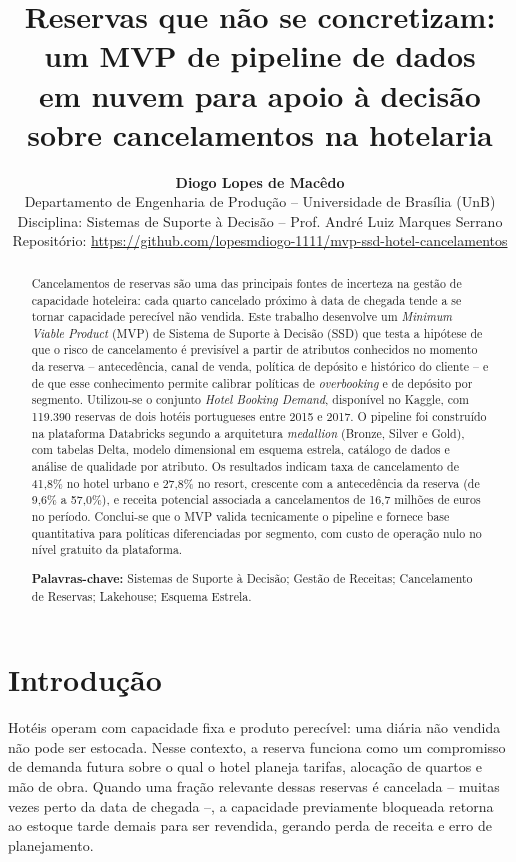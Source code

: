 \documentclass[11pt,a4paper]{article}
\title{\vspace{-1.6cm}\textbf{Reservas que não se concretizam: um MVP de pipeline de dados\\
em nuvem para apoio à decisão sobre cancelamentos na hotelaria}}
\author{%
  \textbf{Diogo Lopes de Macêdo}\\
  \small Departamento de Engenharia de Produção -- Universidade de Brasília (UnB)\\
  \small Disciplina: Sistemas de Suporte à Decisão -- Prof. André Luiz Marques Serrano\\
  \small Repositório: \url{https://github.com/lopesmdiogo-1111/mvp-ssd-hotel-cancelamentos}}
\date{\vspace{-0.8cm}}
\begin{document}
\maketitle

\begin{abstract}
\noindent
Cancelamentos de reservas são uma das principais fontes de incerteza na gestão de capacidade hoteleira: cada quarto cancelado próximo à data de chegada tende a se tornar capacidade perecível não vendida. Este trabalho desenvolve um \textit{Minimum Viable Product} (MVP) de Sistema de Suporte à Decisão (SSD) que testa a hipótese de que o risco de cancelamento é previsível a partir de atributos conhecidos no momento da reserva -- antecedência, canal de venda, política de depósito e histórico do cliente -- e de que esse conhecimento permite calibrar políticas de \textit{overbooking} e de depósito por segmento. Utilizou-se o conjunto \textit{Hotel Booking Demand}, disponível no Kaggle, com 119.390 reservas de dois hotéis portugueses entre 2015 e 2017. O pipeline foi construído na plataforma Databricks segundo a arquitetura \textit{medallion} (Bronze, Silver e Gold), com tabelas Delta, modelo dimensional em esquema estrela, catálogo de dados e análise de qualidade por atributo. Os resultados indicam taxa de cancelamento de 41,8\% no hotel urbano e 27,8\% no resort, crescente com a antecedência da reserva (de 9,6\% a 57,0\%), e receita potencial associada a cancelamentos de 16,7 milhões de euros no período. Conclui-se que o MVP valida tecnicamente o pipeline e fornece base quantitativa para políticas diferenciadas por segmento, com custo de operação nulo no nível gratuito da plataforma.

\vspace{4pt}
\noindent\textbf{Palavras-chave:} Sistemas de Suporte à Decisão; Gestão de Receitas; Cancelamento de Reservas; Lakehouse; Esquema Estrela.
\end{abstract}

\section{Introdução}

Hotéis operam com capacidade fixa e produto perecível: uma diária não vendida não pode ser estocada. Nesse contexto, a reserva funciona como um compromisso de demanda futura sobre o qual o hotel planeja tarifas, alocação de quartos e mão de obra. Quando uma fração relevante dessas reservas é cancelada -- muitas vezes perto da data de chegada --, a capacidade previamente bloqueada retorna ao estoque tarde demais para ser revendida, gerando perda de receita e erro de planejamento.
\end{document}
